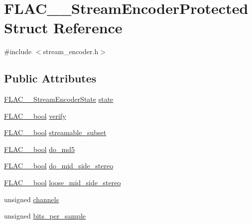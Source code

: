 \hypertarget{struct_f_l_a_c_____stream_encoder_protected}{}\section{F\+L\+A\+C\+\_\+\+\_\+\+Stream\+Encoder\+Protected Struct Reference}
\label{struct_f_l_a_c_____stream_encoder_protected}


{\ttfamily \#include $<$stream\+\_\+encoder.\+h$>$}

\subsection*{Public Attributes}
\begin{DoxyCompactItemize}
\item 
\hyperlink{group__flac__stream__encoder_gac5e9db4fc32ca2fa74abd9c8a87c02a5}{F\+L\+A\+C\+\_\+\+\_\+\+Stream\+Encoder\+State} \hyperlink{struct_f_l_a_c_____stream_encoder_protected_a731d57e1021033f80e40eac926714bd3}{state}
\item 
\hyperlink{ordinals_8h_a95103469f1cbd78b8cf250194985b34e}{F\+L\+A\+C\+\_\+\+\_\+bool} \hyperlink{struct_f_l_a_c_____stream_encoder_protected_a5124181d867109988d7c2c1285e1ee45}{verify}
\item 
\hyperlink{ordinals_8h_a95103469f1cbd78b8cf250194985b34e}{F\+L\+A\+C\+\_\+\+\_\+bool} \hyperlink{struct_f_l_a_c_____stream_encoder_protected_a0e0bfefc31b041543eecfcc98b8a0129}{streamable\+\_\+subset}
\item 
\hyperlink{ordinals_8h_a95103469f1cbd78b8cf250194985b34e}{F\+L\+A\+C\+\_\+\+\_\+bool} \hyperlink{struct_f_l_a_c_____stream_encoder_protected_a85c8eeaf32a5735a90ee8b94053be0b6}{do\+\_\+md5}
\item 
\hyperlink{ordinals_8h_a95103469f1cbd78b8cf250194985b34e}{F\+L\+A\+C\+\_\+\+\_\+bool} \hyperlink{struct_f_l_a_c_____stream_encoder_protected_aa9fac371fbad323691401e2db370da41}{do\+\_\+mid\+\_\+side\+\_\+stereo}
\item 
\hyperlink{ordinals_8h_a95103469f1cbd78b8cf250194985b34e}{F\+L\+A\+C\+\_\+\+\_\+bool} \hyperlink{struct_f_l_a_c_____stream_encoder_protected_a099f7d60ad3151618e30edf47d948a10}{loose\+\_\+mid\+\_\+side\+\_\+stereo}
\item 
unsigned \hyperlink{struct_f_l_a_c_____stream_encoder_protected_a49a4d8aeebc487582a78a789339bf2ca}{channels}
\item 
unsigned \hyperlink{struct_f_l_a_c_____stream_encoder_protected_aa6b763ddfadc2d9fc188a6f7367672e6}{bits\+\_\+per\+\_\+sample}

\end{DoxyCompactItemize}
